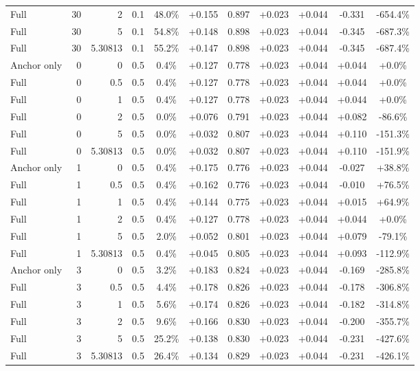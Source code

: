 \begin{table}[htbp]
\begin{tabular}{lrrrccccccc}
Full & 30 & 2 & 0.1 & 48.0\% & +0.155 & 0.897 & +0.023 & +0.044 & -0.331 & -654.4\% \\
Full & 30 & 5 & 0.1 & 54.8\% & +0.148 & 0.898 & +0.023 & +0.044 & -0.345 & -687.3\% \\
Full & 30 & 5.30813 & 0.1 & 55.2\% & +0.147 & 0.898 & +0.023 & +0.044 & -0.345 & -687.4\% \\
Anchor only & 0 & 0 & 0.5 & 0.4\% & +0.127 & 0.778 & +0.023 & +0.044 & +0.044 & +0.0\% \\
Full & 0 & 0.5 & 0.5 & 0.4\% & +0.127 & 0.778 & +0.023 & +0.044 & +0.044 & +0.0\% \\
Full & 0 & 1 & 0.5 & 0.4\% & +0.127 & 0.778 & +0.023 & +0.044 & +0.044 & +0.0\% \\
Full & 0 & 2 & 0.5 & 0.0\% & +0.076 & 0.791 & +0.023 & +0.044 & +0.082 & -86.6\% \\
Full & 0 & 5 & 0.5 & 0.0\% & +0.032 & 0.807 & +0.023 & +0.044 & +0.110 & -151.3\% \\
Full & 0 & 5.30813 & 0.5 & 0.0\% & +0.032 & 0.807 & +0.023 & +0.044 & +0.110 & -151.9\% \\
Anchor only & 1 & 0 & 0.5 & 0.4\% & +0.175 & 0.776 & +0.023 & +0.044 & -0.027 & +38.8\% \\
Full & 1 & 0.5 & 0.5 & 0.4\% & +0.162 & 0.776 & +0.023 & +0.044 & -0.010 & +76.5\% \\
Full & 1 & 1 & 0.5 & 0.4\% & +0.144 & 0.775 & +0.023 & +0.044 & +0.015 & +64.9\% \\
Full & 1 & 2 & 0.5 & 0.4\% & +0.127 & 0.778 & +0.023 & +0.044 & +0.044 & +0.0\% \\
Full & 1 & 5 & 0.5 & 2.0\% & +0.052 & 0.801 & +0.023 & +0.044 & +0.079 & -79.1\% \\
Full & 1 & 5.30813 & 0.5 & 0.4\% & +0.045 & 0.805 & +0.023 & +0.044 & +0.093 & -112.9\% \\
Anchor only & 3 & 0 & 0.5 & 3.2\% & +0.183 & 0.824 & +0.023 & +0.044 & -0.169 & -285.8\% \\
Full & 3 & 0.5 & 0.5 & 4.4\% & +0.178 & 0.826 & +0.023 & +0.044 & -0.178 & -306.8\% \\
Full & 3 & 1 & 0.5 & 5.6\% & +0.174 & 0.826 & +0.023 & +0.044 & -0.182 & -314.8\% \\
Full & 3 & 2 & 0.5 & 9.6\% & +0.166 & 0.830 & +0.023 & +0.044 & -0.200 & -355.7\% \\
Full & 3 & 5 & 0.5 & 25.2\% & +0.138 & 0.830 & +0.023 & +0.044 & -0.231 & -427.6\% \\
Full & 3 & 5.30813 & 0.5 & 26.4\% & +0.134 & 0.829 & +0.023 & +0.044 & -0.231 & -426.1\% \\

\end{tabular}
\end{table}
